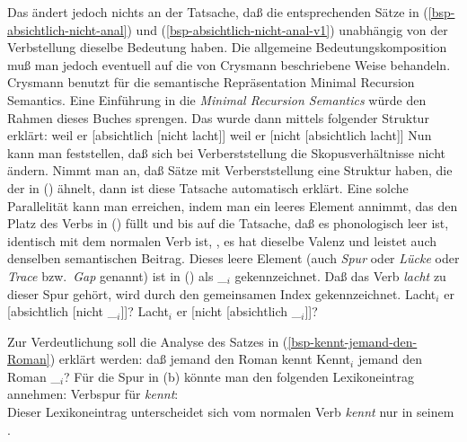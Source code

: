 \begin{enumerate}
{\z
Das ändert jedoch nichts an der Tatsache, daß die entsprechenden
Sätze in (\ref{bsp-absichtlich-nicht-anal}) und (\ref{bsp-absichtlich-nicht-anal-v1}) unabhängig von der Verbstellung
dieselbe Bedeutung haben. Die allgemeine Bedeutungskomposition muß man jedoch eventuell
auf die von Crysmann beschriebene Weise behandeln. Crysmann benutzt für die semantische Repräsentation
Minimal Recursion Semantics. 
Eine Einführung in die \emph{Minimal Recursion Semantics} würde den Rahmen dieses Buches sprengen.%
}
Das wurde dann mittels folgender Struktur erklärt:
\eal
\label{bsp-absichtlich-nicht-anal}
\ex weil er [absichtlich [nicht lacht]]
\ex weil er [nicht [absichtlich lacht]]
\zl
Nun kann man feststellen, daß sich bei Verberststellung die Skopusverhältnisse nicht ändern.
Nimmt man an, daß Sätze mit Verberststellung eine Struktur haben, die der in ()
ähnelt, dann ist diese Tatsache automatisch erklärt. Eine solche Parallelität kann man
erreichen, indem man ein leeres Element annimmt, das den Platz des Verbs in () füllt
und bis auf die Tatsache, daß es phonologisch leer ist, identisch
mit dem normalen Verb ist, \dash, es hat dieselbe Valenz und leistet auch denselben semantischen
Beitrag. Dieses leere Element (auch \emph{Spur} oder \emph{Lücke}
oder \emph{Trace} bzw.\ \emph{Gap} genannt)
ist in () als \_$_i$ gekennzeichnet. 
Daß das Verb \emph{lacht} zu dieser Spur gehört, wird durch den gemeinsamen
Index gekennzeichnet.
\eal
\label{bsp-absichtlich-nicht-anal-v1}
\ex Lacht$_i$ er [absichtlich [nicht \_$_i$]]?
\ex Lacht$_i$ er [nicht [absichtlich \_$_i$]]?
\zl{}
\nocite{Hoehle88a,Hoehle97a}
\end{enumerate}
Zur Verdeutlichung soll die Analyse des Satzes in (\ref{bsp-kennt-jemand-den-Roman}) erklärt werden:
\eal
\ex daß jemand den Roman kennt\label{bsp-dass-jemand-den-Roman-kennt}
\ex Kennt$_i$ jemand den Roman \_$_i$?\label{bsp-kennt-jemand-den-Roman}
\zl
Für die Spur in (b) könnte man den folgenden Lexikoneintrag annehmen:
\ea
Verbspur für \emph{kennt}:\\\samepage
{}
\z
Dieser Lexikoneintrag unterscheidet sich vom normalen Verb \emph{kennt} nur in seinem \phonw.

